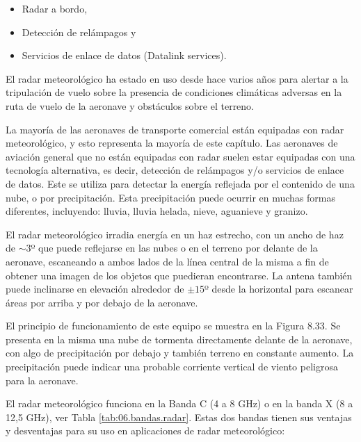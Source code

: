\begin{itemize}
     \item Radar a bordo,
     \item Detección de rel\'ampagos y
     \item Servicios de enlace de datos (Datalink services).
\end{itemize}

 El radar meteorológico ha estado en uso desde hace varios años para alertar a la tripulación de vuelo sobre la presencia de condiciones climáticas adversas en la ruta de vuelo de la aeronave y obst\'aculos sobre el terreno. 

 La mayoría de las aeronaves de transporte comercial están equipadas con radar meteorológico, y esto representa la mayoría de este capítulo. Las aeronaves de aviación general que no están equipadas con radar suelen estar equipadas con una tecnología alternativa, es decir, detección de rel\'ampagos y/o servicios de enlace de datos.
 Este se utiliza para  detectar la energía reflejada por el contenido de una nube, o por precipitación. Esta precipitación puede ocurrir en muchas formas diferentes, incluyendo: lluvia, lluvia helada, nieve, aguanieve y granizo. 

 El radar meteorológico irradia energía en un haz estrecho, con un ancho de haz de $\sim 3$º que puede reflejarse en las nubes o en el terreno por delante de la aeronave, escaneando a ambos lados de la línea central de la misma a fin de obtener  una imagen de los objetos que puedieran encontrarse. La antena también puede inclinarse en elevación alrededor de $\pm 15$º desde la horizontal para escanear áreas por arriba y por debajo de la aeronave.

El principio de funcionamiento de este equipo se muestra en la 
Figura 8.33. Se presenta en la misma una nube de tormenta directamente delante de la aeronave, con algo de precipitación por debajo y también terreno en constante aumento. La precipitación puede indicar  una probable corriente vertical de viento peligrosa para la aeronave.

 El radar meteorológico funciona en la Banda C (4 a 8 GHz) o en la banda X (8 a 12,5 GHz), 
ver Tabla \ref{tab:06.bandas.radar}. 
Estas dos bandas tienen sus ventajas y desventajas para su uso en aplicaciones de radar meteorológico:




